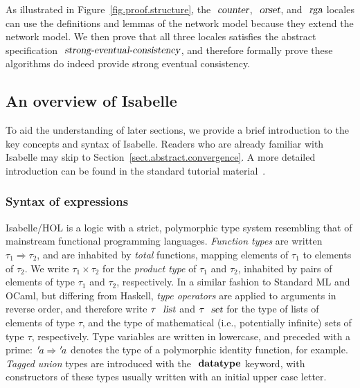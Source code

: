 As illustrated in Figure~\ref{fig.proof.structure}, the $\isa{counter}$, $\isa{orset}$, and $\isa{rga}$ locales can use the definitions and lemmas of the network model because they extend the network model. We then prove that all three locales satisfies the abstract specification $\isa{strong-eventual-consistency}$, and therefore formally prove these algorithms do indeed provide strong eventual consistency.

\subsection{An overview of Isabelle}
\label{subsect.an.overview.of.isabelle}

To aid the understanding of later sections, we provide a brief introduction to the key concepts and syntax of Isabelle.
Readers who are already familiar with Isabelle may skip to Section~\ref{sect.abstract.convergence}.
A more detailed introduction can be found in the standard tutorial material~\cite{DBLP:books/sp/NipkowK14}.

\subsubsection{Syntax of expressions}\label{sect.isabelle.syntax}

Isabelle/HOL is a logic with a strict, polymorphic type system resembling that of mainstream functional programming languages.
\emph{Function types} are written $\tau_1 \Rightarrow \tau_2$, and are inhabited by \emph{total} functions, mapping elements of $\tau_1$ to elements of $\tau_2$.
We write $\tau_1 \times \tau_2$ for the \emph{product type} of $\tau_1$ and $\tau_2$, inhabited by pairs of elements of type $\tau_1$ and $\tau_2$, respectively.
In a similar fashion to Standard ML and OCaml, but differing from Haskell, \emph{type operators} are applied to arguments in reverse order, and therefore write $\tau\ \isa{list}$ and $\tau\ \isa{set}$ for the type of lists of elements of type $\tau$, and the type of mathematical (i.e., potentially infinite) sets of type $\tau$, respectively.
Type variables are written in lowercase, and preceded with a prime: ${\emph{$\mskip2mu{'}\mskip-2mu$}}a \Rightarrow {\emph{$\mskip2mu{'}\mskip-2mu$}}a$ denotes the type of a polymorphic identity function, for example.
\emph{Tagged union} types are introduced with the $\isacommand{datatype}$ keyword, with constructors of these types usually written with an initial upper case letter.

